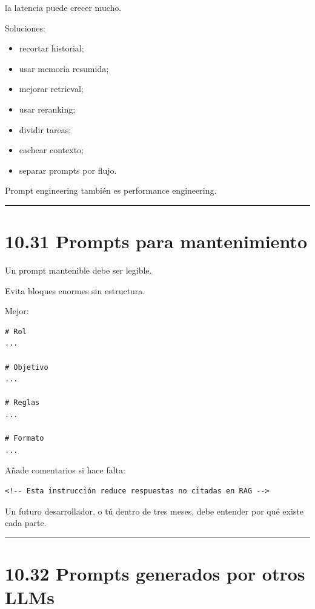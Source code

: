 la latencia puede crecer mucho.

Soluciones:

\begin{itemize}
\tightlist
\item
  recortar historial;
\item
  usar memoria resumida;
\item
  mejorar retrieval;
\item
  usar reranking;
\item
  dividir tareas;
\item
  cachear contexto;
\item
  separar prompts por flujo.
\end{itemize}

Prompt engineering también es performance engineering.

\begin{center}\rule{0.5\linewidth}{0.5pt}\end{center}

\section{10.31 Prompts para
mantenimiento}\label{prompts-para-mantenimiento}

Un prompt mantenible debe ser legible.

Evita bloques enormes sin estructura.

Mejor:

\begin{lstlisting}
# Rol
...

# Objetivo
...

# Reglas
...

# Formato
...
\end{lstlisting}

Añade comentarios si hace falta:

\begin{lstlisting}
<!-- Esta instrucción reduce respuestas no citadas en RAG -->
\end{lstlisting}

Un futuro desarrollador, o tú dentro de tres meses, debe entender por
qué existe cada parte.

\begin{center}\rule{0.5\linewidth}{0.5pt}\end{center}

\section{10.32 Prompts generados por otros
LLMs}\label{prompts-generados-por-otros-llms}

